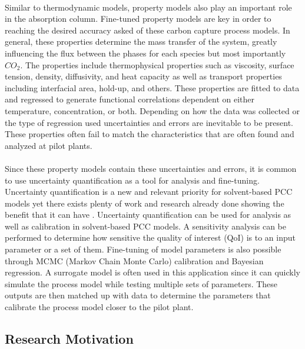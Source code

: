 \documentclass[12pt, letterpaper]{article}
\begin{document}
\paragraph{}
Similar to thermodynamic models, property models also play an important role in the absorption column. Fine-tuned property models are key in order to reaching the desired accuracy asked of these carbon capture process models. In general, these properties determine the mass transfer of the system, greatly influencing the flux between the phases for each species but most importantly $CO_2$. The properties include thermophysical properties such as viscosity, surface tension, density, diffusivity, and heat capacity as well as transport properties including interfacial area, hold-up, and others.  These properties are fitted to data and regressed to generate functional correlations dependent on either temperature, concentration, or both.  Depending on how the data was collected or the type of regression used uncertainties and errors are inevitable to be present. These properties often fail to match the characteristics that are often found and analyzed at pilot plants. 

\paragraph{}
Since these property models contain these uncertainties and errors, it is common to use uncertainty quantification as a tool for analysis and fine-tuning. Uncertainty quantification is a new and relevant priority for solvent-based PCC models yet there exists plenty of work and research already done showing the benefit that it can have \cite{Morgan2020}.  Uncertainty quantification can be used for analysis as well as calibration in solvent-based PCC models. A sensitivity analysis can be performed to determine how sensitive the quality of interest (QoI) is to an input parameter or a set of them. Fine-tuning of model parameters is also possible through MCMC (Markov Chain Monte Carlo) calibration and Bayesian regression. A surrogate model is often used in this application since it can quickly simulate the process model while testing multiple sets of parameters. These outputs are then matched up with data to determine the parameters that calibrate the process model closer to the pilot plant. 


\subsection{Research Motivation}
\end{document}
